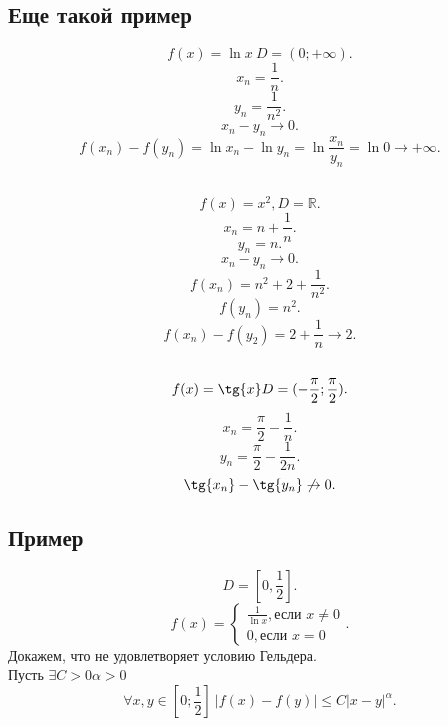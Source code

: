 \documentclass{scrartcl}
\begin{document}
\subsection{Еще такой пример}
\[
	f(x) = \ln{x} ~ D = (0;+\infty)
	.\]
\[
	x_{n} = \frac{1}{n}
	.\]
\[
	y_{n} = \frac{1}{n^2}
	.\]
\[
	x_{n} - y_{n} \to 0
	.\]
\[
	f(x_{n}) - f(y_{n}) = \ln{x_{n}} - \ln{y_{n}} = \ln{\frac{x_{n}}{y_{n}}} = \ln{0} \to +\infty
	.\]
\subsection{}
\[
	f(x) = x^2, D =\mathbb{R}
	.\]
\[
	x_{n} =  n + \frac{1}{n}
	.\]
\[
	y_{n} = n
	.\]
\[
	x_{n} - y_{n} \to 0
	.\]
\[
	f(x_{n}) = n^2 + 2 + \frac{1}{n^2}
	.\]
\[
	f(y_{n}) =n ^2
	.\]
\[
	f(x_{n}) - f(y_{2}) = 2 + \frac{1}{n} \to 2
	.\]
\subsection{}
\[
	f(x) = \tg{x} D = (-\frac{\pi}{2};\frac{\pi}{2})
	.\]
\[
	x_{n} = \frac{\pi}{2} - \frac{1}{n}
	.\]
\[
	y_{n} = \frac{\pi}{2} - \frac{1}{2n}
	.\]
\[
	\tg{x_{n}} - \tg{y_{n}} \not \to 0
	.\]
\subsection{Пример}
\[
	D = [0,\frac{1}{2}]
	.\]
\[
	f(x) =
	\begin{cases}
		\frac{1}{\ln{x}}, \text{если } x \neq 0 \\
		0, \text{если } x = 0
	\end{cases}
	.\]
Докажем, что не удовлетворяет условию Гельдера.\\
Пусть $\exists  C >0 \alpha >0 $
\[
	\forall  x, y \in [0; \frac{1}{2}] ~ |f(x) - f(y)| \le  C |x - y|^{\alpha}
	.\]
\end{document}

